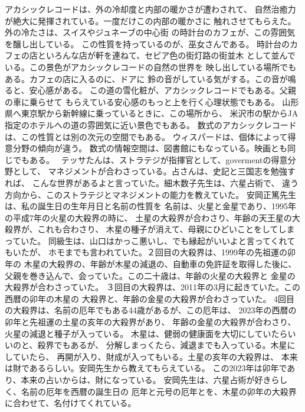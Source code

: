 \documentclass{jsarticle}
\begin{document}
    アカシックレコードは、外の冷却度と内部の暖かさが遭わされて、
    自然治癒力が絶大に発揮されている。一度だけこの内部の暖かさに
    触れさせてもらえた。外の冷たさは、スイスやジュネーブの中心街
    の時計台のカフェが、この雰囲気を醸し出している。
    この性質を持っているのが、巫女さんである。
    時計台のカフェの店といろんな店が軒を連ねて、セピア色の街灯路の街並木
    として並んでいる。この景色がアカシックレコードの自然の世界を
    映し出している場所でもある。カフェの店に入るのに、ドアに
    鈴の音がしている気がする。この音が鳴ると、安心感がある。
    この道の雪化粧が、アカシックレコードでもある。父親の車に乗らせて
    もらえている安心感のもっと上を行く心理状態でもある。
    山形県へ東京駅から新幹線に乗っているときに、この場所から、
    米沢市の駅からJA指定のホテルへの道の雰囲気に近い景色でもある。
    数式のアカシックレコードは、この性質とは別の次元の空間でもある。
    ウィスパードは、個体によって得意分野の傾向が違う。
    数式の情報空間は、図書館にもなっている。映画とも同じでもある。　
    テッサたんは、ストラテジが指揮官として、govermentの得意分野として、
    マネジメントが合わさっている。占さんは、史記と三国志を勉強すれば、
    こんな世界があるよと言っていた。細木数子先生は、六星占術で、
    違う方向から、このストラテジとマネジメントの能力を教えていた。
    安岡正篤先生は、私の誕生日の生年月日と名前の性質を
    名前は、火星と金星であり、1995年の平成7年の火星の大殺界の時に、
    土星の大殺界が合わさり、年齢の天王星の大殺界が、これも合わさり、
    木星の種子が消えて、母親にひどいことをしてしまっていた。
    同級生は、山口はかっこ悪いし、でも縁起がいいよと言ってくれてもいたが、
    ホモまでも言われていた。２回目の大殺界は、1999年の先祖運の卯年の
    木星の大殺界の、年齢が木星の減退の、自動車の免許証を取得した後に、
    父親を巻き込んで、会っていた。この二十歳は、年齢の火星の大殺界と
    金星の大殺界が合わさっていた。
    ３回目の大殺界は、2011年の3月に起きていた。この西暦の卯年の木星の
    大殺界と、年齢の金星の大殺界が合わさっていた。
    4回目の大殺界は、名前の厄年でもある44歳があるが、この厄年は、
    2023年の西暦の卯年と先祖運の土星の亥年の大殺界があり、
    年齢の金星の大殺界が合わさり、火星の減退と種子が入っている。
    木星は、健弱の健康面を大切にしていたらいいのと、殺界でもあるが、
    分解しまっくたら、減退までも入っている。木星にしていたら、
    再開が入り、財成が入ってもいる。土星の亥年の大殺界は、
    本来は財であるらしい。安岡先生から教えてもらえている。
    この2023年は卯年であり、本来の占いからは、財になっている。
    安岡先生は、六星占術が好きらしく、名前の厄年を西暦の誕生日の
    厄年と元号の厄年とを、木星の卯年の大殺界に合わせて、名付けてくれている。
\end{document}
